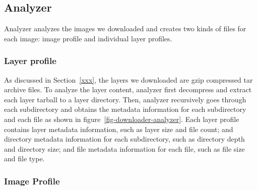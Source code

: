 \subsection{Analyzer}

Analyzer analyzes the images we downloaded and creates two kinds of files for each image: image profile and individual layer profiles.
%
%
\subsubsection{Layer profile}

As discussed in Section~\ref{xxx}, the layers we downloaded are gzip compressed tar archive files.
%
To analyze the layer content, analyzer first decompress and extract each layer tarball to a layer directory.
%
Then, analyzer recursively goes through each subdirectory and obtains the metadata information for each subdirectory and each file as shown in figure~\ref{fig-downloader-analyzer}. Each layer profile contains layer metadata information, such as layer size and file count; and directory metadata information for each subdirectory, such as directory depth and directory size; and file metadata information for each file, such as file size and file type.
%






\subsubsection{Image Profile}

